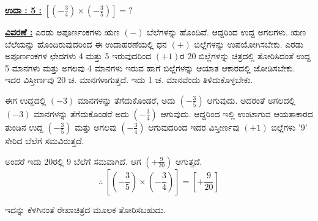 \newpage


\noindent
{\textbf{\underline{ಉದಾ : 5 :}}} $\left[\left(-\frac{3}{4} \right) \times \left(-\frac{3}{5} \right) \right] = ?$

\vspace{.2cm}

\noindent
{\textbf{\underline{ವಿವರಣೆ :}}} ಎರಡು ಅಪೂರ್ಣಂಕಗಳು ಋಣ $(-)$ ಬೆಲೆಗಳನ್ನು ಹೊಂದಿವೆ. ಆದ್ದರಿಂದ ಉದ್ದ ಅಗಲಗಳು. ಋಣ ಬೆಲೆಯನ್ನು ಹೊಂದಿರುವುದರಿಂದ ಈ ಉದಾಹರಣೆಯಲ್ಲಿ ಧನ $(+)$ ಬಿಲ್ಲೆಗಳನ್ನು ಉಪಯೋಗಿಸಬೇಕು. ಎರಡು ಅಪೂರ್ಣಂಕಗಳ ಛೇದಗಳು 4 ಮತ್ತು 5 ಇರುವುದರಿಂದ $(+1)$ರ 20 ಬಿಲ್ಲೆಗಳನ್ನು ಚಿತ್ರದಲ್ಲಿ ತೋರಿಸಿದಂತೆ ಉದ್ದ 5 ಮಾನಗಳು ಮತ್ತು ಅಗಲವು 4 ಮಾನಗಳು ಇರುವ ಹಾಗೆ ಬಿಲ್ಲೆಗಳನ್ನು ಆಯಾತ ಆಕಾರದಲ್ಲಿ ಜೋಡಿಸಬೇಕು. ಇದರ ವಿಸ್ತೀರ್ಣವು 20 ಚ. ಮಾನಗಳಾಗುತ್ತದೆ. ಇದು 1 ಚ. ಮಾನವೆಂದು ತಿಳಿದುಕೊಳ್ಳ\break ಬೇಕು. 

ಈಗ ಉದ್ದದಲ್ಲಿ $(-3)$ ಮಾನಗಳನ್ನು ತೆಗೆದುಕೊಂಡರೆ, ಅದು $\left(-\frac{3}{5}\right)$ ಆಗುವುದು. ಅದರಂತೆ ಅಗಲದಲ್ಲಿ $(-3)$ ಮಾನಗಳನ್ನು ತೆಗೆದುಕೊಂಡರೆ ಅದು $\left(-\frac{3}{4} \right)$ ಆಗುವುದು. ಆದ್ದರಿಂದ ಇಲ್ಲಿ ಉಂಟಾಗುವ ಆಯತಾಕಾರದ ತುಂಡಿನ ಉದ್ದ $\left(-\frac{3}{5} \right)$ ಮತ್ತು ಅಗಲವು $\left(-\frac{3}{4}\right)$ ಆಗುವುದರಿಂದ ಇದರ ವಿಸ್ತೀರ್ಣವು $(+1)$ ಬಿಲ್ಲೆಗಳು '9' ಸೇರಿದ ಬೆಲೆಗೆ ಸಮ\-ವಿರುತ್ತದೆ.

ಅಂದರೆ ಇದು 20ರಲ್ಲಿ 9 ಬೆಲೆಗೆ ಸಮವಾಗಿದೆ. ಆಗ $\left(+\frac{9}{20} \right)$ ಆಗುತ್ತದೆ. 
$$
\therefore~ \left[\left(-\frac{3}{5}\right) \times \left(-\frac{3}{4}\right) \right] = \left[+\frac{9}{20} \right]
$$

ಇದನ್ನು ಕೆಳಗಿನಂತೆ ರೇಖಾಚಿತ್ರದ ಮೂಲಕ ತೋರಿಸಬಹುದು. 


